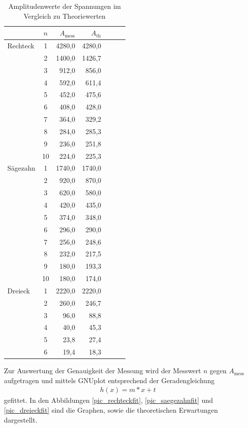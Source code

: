 \begin{table}[H]
 \begin{tabular}{l|c|r|r|r|r|r}
	&$n$	&$A_{\text{mess}}$&	$A_{\text{th}}$\\
	\hline
Rechteck&	1&	4280,0&	4280,0\\
	&2&	1400,0&	1426,7\\
	&3&	912,0&	856,0\\
	&4&	592,0&	611,4\\
	&5&	452,0&	475,6\\
	&6&	408,0&	428,0\\
	&7&	364,0&	329,2\\
	&8&	284,0&	285,3\\
	&9&	236,0&	251,8\\
	&10	&224,0&	225,3 \\
	\hline
Sägezahn&	1&	1740,0&	1740,0\\
&	2&	920,0&	870,0\\
&	3&	620,0&	580,0\\
&	4&	420,0&	435,0\\
&	5&	374,0&	348,0\\
&	6&	296,0&	290,0\\
&	7&	256,0&	248,6\\
&	8&	232,0&	217,5\\
&	9&	180,0&	193,3\\
&	10&	180,0&	174,0\\
\hline
Dreieck	&1&	2220,0&	2220,0\\
&	2&	260,0	&246,7\\
&	3&	96,0&	88,8\\
&	4&	40,0&	45,3\\
&	5&	23,8&	27,4\\
&	6	&19,4&	18,3\\

 \end{tabular}
\caption{Amplitudenwerte der Spannungen im Vergleich zu Theoriewerten}
\label{tab_fouriertrafo}
\end{table}
Zur Auswertung der Genauigkeit der Messung wird der Messwert $n$ gegen $A_{\text{mess}}$ aufgetragen und mittels GNUplot entsprechend
der Geradengleichung 
\begin{align}
 h(x)=m*x +t
 \label{eq_geradex}
\end{align}
gefittet. In den Abbildungen \ref{pic_rechteckfit}, \ref{pic_saegezahnfit} und \ref{pic_dreieckfit} sind die Graphen, sowie die 
theoretischen Erwartungen dargestellt.

